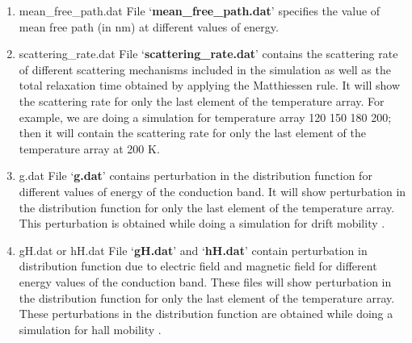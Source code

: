 \documentclass[12pt]{article}
\begin{document}
\begin{enumerate}

\item mean\_free\_path.dat
\newline File \lq \textbf{mean\_free\_path.dat}\rq \hspace{0.5mm} specifies the value of mean free path (in nm) at different values of energy.

\item scattering\_rate.dat
\newline File \lq \textbf{scattering\_rate.dat}\rq \hspace{0.5mm} contains the scattering rate of different scattering mechanisms included in the simulation as well as the total relaxation time obtained by applying the Matthiessen rule. It will show the scattering rate for only the last element of the temperature array. For example, we are doing a simulation for temperature array 120 150 180 200; then it will contain the scattering rate for only the last element of the temperature array at 200 K. 

\item g.dat
\newline File \lq \textbf{g.dat}\rq \hspace{0.5mm} contains perturbation in the distribution function for different values of energy of the conduction band. It will show perturbation in the distribution function for only the last element of the temperature array. This perturbation is obtained while doing a simulation for drift mobility \cite{rode1}.

\item gH.dat or hH.dat
\newline File \lq \textbf{gH.dat}\rq \hspace{0.5mm} and \lq \textbf{hH.dat}\rq \hspace{0.5mm} contain perturbation in distribution function due to electric field and magnetic field for different energy values of the conduction band. These files will show perturbation in the distribution function for only the last element of the temperature array. These perturbations in the distribution function are obtained while doing a simulation for hall mobility \cite{rode4}.


\end{enumerate}
\end{document}
